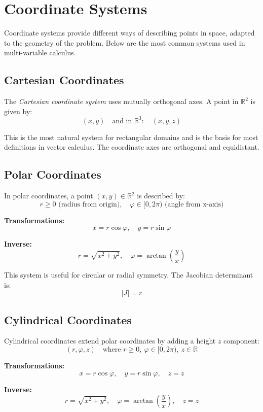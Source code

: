 \newpage
\section{Coordinate Systems}

Coordinate systems provide different ways of describing points in space, adapted to the geometry of the problem. Below are the most 
common systems used in multi-variable calculus.

\subsection{Cartesian Coordinates}

The \emph{Cartesian coordinate system} uses mutually orthogonal axes. A point in \( \mathbb{R}^2 \) is given by:
\[
(x, y)
\quad \text{and in } \mathbb{R}^3: \quad (x, y, z)
\]

This is the most natural system for rectangular domains and is the basis for most definitions in vector calculus. The coordinate axes are orthogonal and equidistant.


\subsection{Polar Coordinates}

In polar coordinates, a point \( (x, y) \in \mathbb{R}^2 \) is described by:
\[
r \ge 0 \text{ (radius from origin)}, \quad \varphi \in [0, 2\pi) \text{ (angle from x-axis)}
\]

\textbf{Transformations:}
\[
x = r \cos \varphi, \quad y = r \sin \varphi
\]

\textbf{Inverse:}
\[
r = \sqrt{x^2 + y^2}, \quad \varphi = \arctan\left(\frac{y}{x}\right)
\]

This system is useful for circular or radial symmetry. The Jacobian determinant is:
\[
|J| = r
\]



\subsection{Cylindrical Coordinates}

Cylindrical coordinates extend polar coordinates by adding a height \( z \) component:
\[
(r, \varphi, z) \quad \text{where } r \ge 0, \ \varphi \in [0, 2\pi), \ z \in \mathbb{R}
\]

\textbf{Transformations:}
\[
x = r \cos \varphi, \quad y = r \sin \varphi, \quad z = z
\]

\textbf{Inverse:}
\[
r = \sqrt{x^2 + y^2}, \quad \varphi = \arctan\left(\frac{y}{x}\right), \quad z = z
\]

